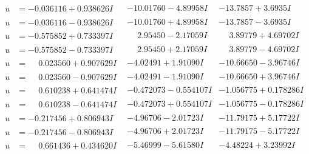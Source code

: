 \documentclass[1p]{elsarticle_modified}
\theoremstyle{definition}
\begin{document}
$$\begin{array}{c|c|c}
\begin{aligned}
u &= -0.036116 + 0.938626 I\end{aligned}
 & -10.01760 - 4.89958 I & -13.7857 + 3.6935 I \\ \hline\begin{aligned}
u &= -0.036116 - 0.938626 I\end{aligned}
 & -10.01760 + 4.89958 I & -13.7857 - 3.6935 I \\ \hline\begin{aligned}
u &= -0.575852 + 0.733397 I\end{aligned}
 & \phantom{-}2.95450 - 2.17059 I & \phantom{-}3.89779 + 4.69702 I \\ \hline\begin{aligned}
u &= -0.575852 - 0.733397 I\end{aligned}
 & \phantom{-}2.95450 + 2.17059 I & \phantom{-}3.89779 - 4.69702 I \\ \hline\begin{aligned}
u &= \phantom{-}0.023560 + 0.907629 I\end{aligned}
 & -4.02491 + 1.91090 I & -10.66650 - 3.96746 I \\ \hline\begin{aligned}
u &= \phantom{-}0.023560 - 0.907629 I\end{aligned}
 & -4.02491 - 1.91090 I & -10.66650 + 3.96746 I \\ \hline\begin{aligned}
u &= \phantom{-}0.610238 + 0.641474 I\end{aligned}
 & -0.472073 - 0.554107 I & -1.056775 + 0.178286 I \\ \hline\begin{aligned}
u &= \phantom{-}0.610238 - 0.641474 I\end{aligned}
 & -0.472073 + 0.554107 I & -1.056775 - 0.178286 I \\ \hline\begin{aligned}
u &= -0.217456 + 0.806943 I\end{aligned}
 & -4.96706 - 2.01723 I & -11.79175 + 5.17722 I \\ \hline\begin{aligned}
u &= -0.217456 - 0.806943 I\end{aligned}
 & -4.96706 + 2.01723 I & -11.79175 - 5.17722 I \\ \hline\begin{aligned}
u &= \phantom{-}0.661436 + 0.434620 I\end{aligned}
 & -5.46999 - 5.61580 I & -4.48224 + 3.23992 I \\ \hline\begin{aligned}

\end{aligned}
\end{array}$$
\end{document}
